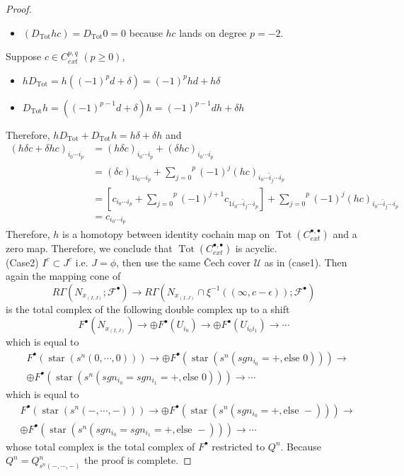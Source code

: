 \begin{proof}
\begin{itemize}
\item $(D_{\operatorname{Tot}}hc) = D_{\operatorname{Tot}}0=0$ because $hc$ lands on degree $p=-2$.
\end{itemize}
Suppose $c\in C_{ext}^{p,q}$ $(p\geq 0)$,
\begin{itemize}
\item $hD_{\operatorname{Tot}} = h((-1)^p d+\delta) = (-1)^p hd + h\delta$

\item $D_{\operatorname{Tot}}h = ((-1)^{p-1}d + \delta)h = (-1)^{p-1}dh + \delta h$
\end{itemize}
Therefore, $hD_{\operatorname{Tot}}+D_{\operatorname{Tot}}h = h\delta + \delta h$ and 
\begin{align*}
(h\delta c + \delta hc)_{i_0 \cdots i_p} &= (h\delta c)_{i_0 \cdots i_p} + (\delta hc)_{i_0 \cdots i_p}\\
&= (\delta c)_{1i_0 \cdots i_p} + \overset{p}{\underset{j=0}{\sum}}
(-1)^j (hc)_{i_0 \cdots \hat{i}_j \cdots i_p}\\
&= [ c_{i_0 \cdots i_p} + \overset{p}{\underset{j=0}{\sum}}
(-1)^{j+1} c_{1i_0 \cdots \hat{i}_j \cdots i_p}] +  \overset{p}{\underset{j=0}{\sum}}
(-1)^j (hc)_{i_0 \cdots \hat{i}_j \cdots i_p}\\
&= c_{i_0 \cdots i_p}
\end{align*}
Therefore, $h$ is a homotopy between identity cochain map on $\operatorname{\operatorname{Tot}}(C_{ext}^{\bullet,\bullet})$ and a zero map. Therefore, we conclude that $\operatorname{Tot}(C_{ext}^{\bullet,\bullet})$ is acyclic.\\
(Case2) $I^c \subset J^c$ i.e. $J=\phi$, then use the same \v{C}ech cover $\mathcal{U}$ as in (case1). Then again the mapping cone of
\[R\Gamma(N_{x_{(I,J)}};\mathscr{F}^\bullet) \rightarrow R\Gamma(N_{x_{(I,J)}} \cap \xi^{-1}((\infty,c-\epsilon));\mathscr{F}^\bullet)
\]
is the total complex of the following double complex up to a shift
\[
F^\bullet (N_{x_{(I,J)}})\rightarrow \oplus F^\bullet(U_{i_0}) \rightarrow \oplus F^\bullet(U_{i_0 i_1}) \rightarrow \cdots
\]
which is equal to 
\begin{align*}
&F^\bullet (\operatorname{star}(s^n(0,\cdots,0)))\rightarrow \oplus F^\bullet(\operatorname{star}(s^n(sgn_{i_0} = +,\text{else }0))) \rightarrow \\
&\oplus F^\bullet(\operatorname{star}(s^n(sgn_{i_0}=sgn_{i_1} = +,\text{else }0))) \rightarrow \cdots
\end{align*}
which is equal to 
\begin{align*}
&F^\bullet (\operatorname{star}(s^n(-,\cdots,-)))\rightarrow\oplus F^\bullet(\operatorname{star}(s^n(sgn_{i_0} = +,\text{else }-))) \rightarrow \\
&\oplus F^\bullet(\operatorname{star}(s^n(sgn_{i_0}=sgn_{i_1} = +,\text{else }-))) \rightarrow \cdots
\end{align*}
whose total complex is the total complex of $F^\bullet$ restricted to $Q^n$. Because $Q^n = Q^n_{s^n(-,\cdots,-)}$ the proof is complete.
\end{proof}
